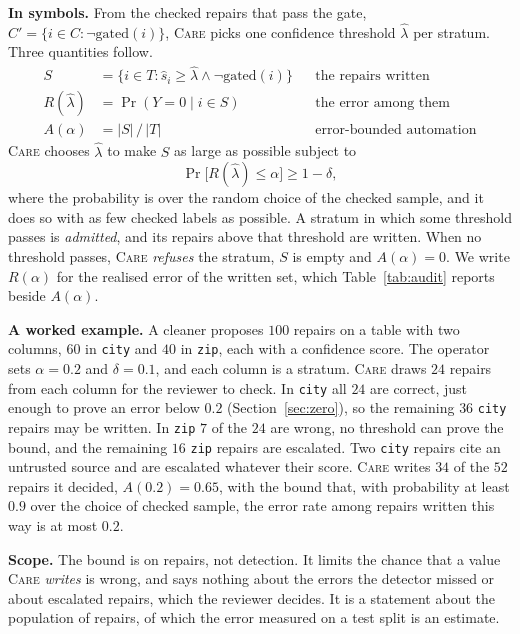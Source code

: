 \documentclass[sigconf, nonacm, balance=false]{acmart}
\theoremstyle{remark}
\begin{document}
\textbf{In symbols.} From the checked repairs that pass the gate,
$C'=\{i\in C:\neg\mathrm{gated}(i)\}$, \textsc{Care} picks one confidence threshold
$\hat\lambda$ per stratum. Three quantities follow.
\begin{align*}
S&=\{i\in T:\hat s_i\ge\hat\lambda\wedge\neg\mathrm{gated}(i)\} &&\text{the repairs written}\\
R(\hat\lambda)&=\Pr(Y=0\mid i\in S) &&\text{the error among them}\\
A(\alpha)&=|S|\,/\,|T| &&\text{error-bounded automation}
\end{align*}
\textsc{Care} chooses $\hat\lambda$ to make $S$ as large as possible subject to
\[
\Pr\bigl[R(\hat\lambda)\le\alpha\bigr]\ge1-\delta ,
\]
where the probability is over the random choice of the checked sample, and it does so
with as few checked labels as possible. A stratum in which some threshold passes is
\emph{admitted}, and its repairs above that threshold are written. When no threshold
passes, \textsc{Care} \emph{refuses} the stratum, $S$ is empty and $A(\alpha)=0$. We
write $R(\alpha)$ for the realised error of the written set, which
Table~\ref{tab:audit} reports beside $A(\alpha)$.

\textbf{A worked example.} A cleaner proposes $100$ repairs on a table with two
columns, $60$ in \texttt{city} and $40$ in \texttt{zip}, each with a confidence score.
The operator sets $\alpha=0.2$ and $\delta=0.1$, and each column is a stratum.
\textsc{Care} draws $24$ repairs from each column for the reviewer to check. In
\texttt{city} all $24$ are correct, just enough to prove an error below $0.2$
(Section~\ref{sec:zero}), so the remaining $36$ \texttt{city} repairs may be written.
In \texttt{zip} $7$ of the $24$ are wrong, no threshold can prove the bound, and the
remaining $16$ \texttt{zip} repairs are escalated. Two \texttt{city} repairs cite an
untrusted source and are escalated whatever their score. \textsc{Care} writes $34$ of
the $52$ repairs it decided, $A(0.2)=0.65$, with the bound that, with probability at
least $0.9$ over the choice of checked sample, the error rate among repairs written this
way is at most $0.2$.

\textbf{Scope.} The bound is on repairs, not detection. It limits the chance that a
value \textsc{Care} \emph{writes} is wrong, and says nothing about the errors the
detector missed or about escalated repairs, which the reviewer decides. It is a statement
about the population of repairs, of which the error measured on a test split is an
estimate.
\end{document}
